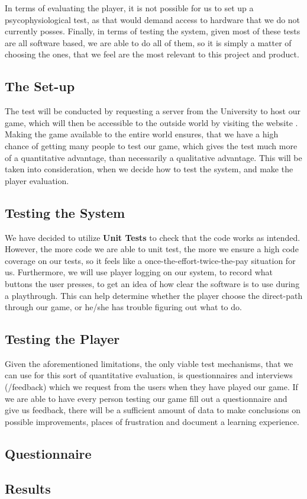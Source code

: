 In terms of evaluating the player, it is not possible for us to set up a psycophysiological test, as that would demand access to hardware that we do not currently posses.
Finally, in terms of testing the system, given most of these tests are all software based, we are able to do all of them, so it is simply a matter of choosing the ones, that we feel are the most relevant to this project and product.

\subsection{The Set-up}

The test will be conducted by requesting a server from the University to host our game, which will then be accessible to the outside world by visiting the website .
Making the game available to the entire world ensures, that we have a high chance of getting many people to test our game, which gives the test much more of a quantitative advantage, than necessarily a qualitative advantage.
This will be taken into consideration, when we decide how to test the system, and make the player evaluation.

\subsection{Testing the System}

We have decided to utilize \textbf{Unit Tests} to check that the code works as intended.
However, the more code we are able to unit test, the more we ensure a high code coverage on our tests, so it feels like a once-the-effort-twice-the-pay situation for us.
Furthermore, we will use player logging on our system, to record what buttons the user presses, to get an idea of how clear the software is to use during a playthrough.
This can help determine whether the player choose the direct-path through our game, or he/she has trouble figuring out what to do.

\subsection{Testing the Player}

Given the aforementioned limitations, the only viable test mechanisms, that we can use for this sort of quantitative evaluation, is questionnaires and interviews (/feedback) which we request from the users when they have played our game.
If we are able to have every person testing our game fill out a questionnaire and give us feedback, there will be a sufficient amount of data to make conclusions on possible improvements, places of frustration and document a learning experience.

\subsection{Questionnaire}

\subsection{Results}
